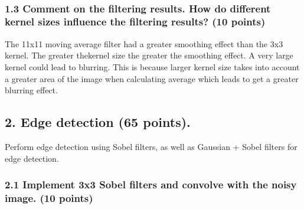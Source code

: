 \documentclass[11pt]{article}
\begin{document}
    \begin{center}
    \end{center}
    { \hspace*{\fill} \\}
    
    \subsubsection{1.3 Comment on the filtering results. How do different
kernel sizes influence the filtering results? (10
points)}\label{comment-on-the-filtering-results.-how-do-different-kernel-sizes-influence-the-filtering-results-10-points}

    The 11x11 moving average filter had a greater smoothing effect than the
3x3 kernel. The greater thekernel size the greater the smoothing effect.
A very large kernel could lead to blurring. This is because larger
kernel size takes into account a greater area of the image when
calculating average which leads to get a greater blurring effect.

    \subsection{2. Edge detection (65
points).}\label{edge-detection-65-points.}

Perform edge detection using Sobel filters, as well as Gaussian + Sobel
filters for edge detection.

    \subsubsection{2.1 Implement 3x3 Sobel filters and convolve with the
noisy image. (10
points)}\label{implement-3x3-sobel-filters-and-convolve-with-the-noisy-image.-10-points}
\end{document}
